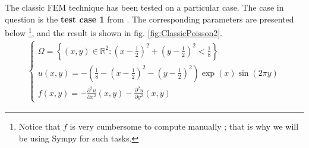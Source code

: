 The classic FEM technique has been tested on a particular case. The case in question is the \textbf{test case 1} from \cite[p.15]{Reference3}. The corresponding parameters are presented below \footnote{Notice that $f$ is very cumbersome to compute manually ; that is why we will be using Sympy for such tasks.}, and the result is shown in fig. \ref{fig:ClassicPoisson2}.
\begin{align}
    \begin{cases}
    \Omega = \left\{ (x,y)\in\mathbb{R}^2: \left( x-\frac{1}{2} \right)^2 + \left( y-\frac{1}{2} \right)^2 < \frac{1}{8}  \right\} \\
    u(x,y)= -\left( \frac{1}{8} - \left( x-\frac{1}{2} \right)^2 - \left( y-\frac{1}{2} \right)^2 \right) \exp(x) \sin(2\pi y)\\
    f(x,y) = -\frac{\partial^2 u}{\partial x^2}(x,y) -\frac{\partial^2 u}{\partial y^2}(x,y)
    \end{cases}
    \label{eq:test2}
\end{align}

    

    
